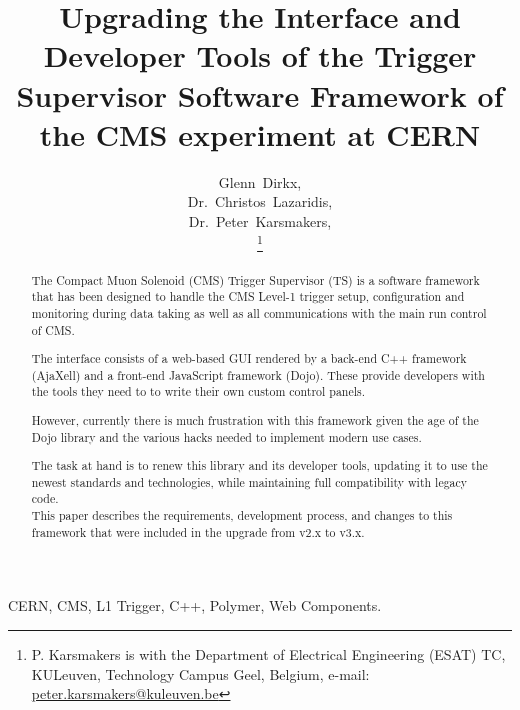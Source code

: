 \documentclass[journal]{IEEEtran}
\begin{document}
\title{Upgrading the Interface and Developer Tools of the Trigger Supervisor Software Framework of the CMS experiment at CERN}

\author{Glenn~Dirkx,\\
        Dr.~Christos~Lazaridis,\\
        Dr.~Peter~Karsmakers,%

\thanks{P. Karsmakers is with the Department of Electrical Engineering (ESAT) TC, KULeuven, Technology Campus Geel, Belgium, e-mail: \url{peter.karsmakers@kuleuven.be}}

}

\maketitle


\begin{abstract}
The Compact Muon Solenoid (CMS) Trigger Supervisor (TS) is a software framework that has been designed to
handle the CMS Level-1 trigger setup, configuration and monitoring during data
taking as well as all communications with the main run control of CMS.

The interface consists of a web-based GUI rendered by a back-end C++ framework
(AjaXell) and a front-end JavaScript framework (Dojo).
These provide developers with the tools they need to to write their own custom
control panels.

However, currently there is much frustration with this framework given the age
of the Dojo library and the various hacks needed to implement modern use cases.

The task at hand is to renew this library and its developer tools, updating it
to use the newest standards and technologies, while maintaining full
compatibility with legacy code.\\

This paper describes the requirements, development process, and changes to
this framework that were included in the upgrade from v2.x to v3.x.
\end{abstract}
\begin{IEEEkeywords}
CERN, CMS, L1 Trigger, C++, Polymer, Web Components.
\end{IEEEkeywords}
\end{document}
